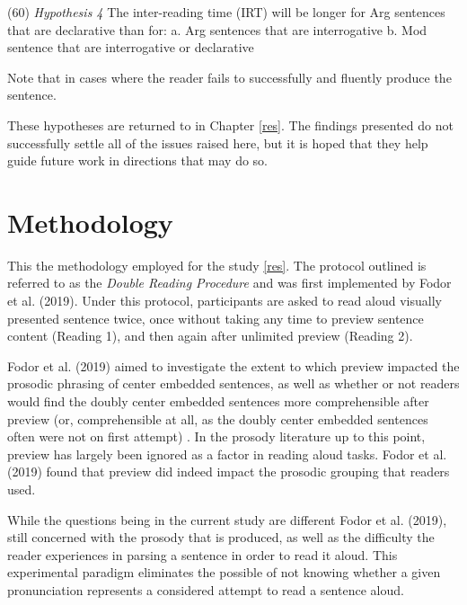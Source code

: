 \documentclass[12pt,oneside]{book}
\begin{document}
(60) \emph{Hypothesis 4}
The inter-reading time (IRT) will be longer for Arg sentences that are declarative than for:
a. Arg sentences that are interrogative
b. Mod sentence that are interrogative or declarative

Note that  in cases where the reader fails to successfully and fluently produce the sentence.

These hypotheses are returned to in Chapter \ref{res}. The findings  presented  do not successfully settle all of the issues raised here, but it is hoped that they  help guide future work in directions that may do so.

\hypertarget{methodology}{%
\chapter{Methodology}\label{methodology}}

This  the methodology employed for the  study  \ref{res}. The protocol outlined is referred to as the \emph{Double Reading Procedure} and was first implemented by Fodor et al. (2019). Under this protocol, participants are asked to read aloud  visually presented sentence twice, once without taking any time to preview sentence content (Reading 1), and then again after unlimited preview (Reading 2).

Fodor et al. (2019) aimed to investigate the extent to which preview impacted the prosodic phrasing of center embedded sentences, as well as whether or not readers would find the doubly center embedded sentences more comprehensible after preview (or, comprehensible at all, as the doubly center embedded sentences often were not on first attempt) . In the prosody literature up to this point, preview has largely been ignored as a factor in reading aloud tasks. Fodor et al. (2019) found that preview did indeed impact  the prosodic grouping that readers used.

While the questions being  in the current study  are different  Fodor et al. (2019),  still concerned with the prosody that is produced, as well as the  difficulty the reader experiences in parsing a sentence in order to read it aloud. This experimental paradigm eliminates the possible  of not knowing whether a given pronunciation represents a  considered  attempt to read a sentence aloud.
\end{document}
